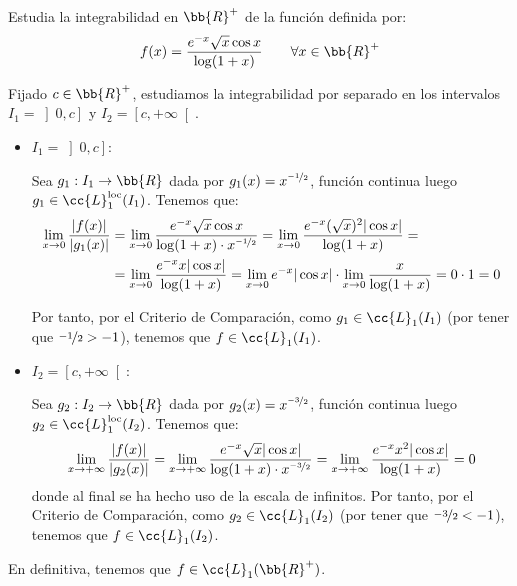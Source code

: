 \begin{ejercicio}
    Estudia la integrabilidad en $\bb{R}^+$ de la función definida por:
    \begin{equation*}
        f(x) = \dfrac{e^{-x}\sqrt{x}\cos x}{\log(1+x)} \qquad \forall x\in \bb{R}^+
    \end{equation*}

    Fijado $c\in \bb{R}^+$, estudiamos la integrabilidad por separado en los intervalos $I_1=\left]0,c\right]$ y $I_2=\left[c,+\infty\right[$.
    \begin{itemize}
        \item \ul{$I_1=\left]0,c\right]$}:
        
        Sea $g_1:I_1\to \bb{R}$ dada por $g_1(x)=x^{\nicefrac{-1}{2}}$, función continua luego $g_1\in \cc{L}_1^{\text{loc}}(I_1)$. Tenemos que:
        \begin{align*}
            \lim_{x\to 0} \dfrac{|f(x)|}{|g_1(x)|}
            &= \lim_{x\to 0} \dfrac{e^{-x}\sqrt{x}\cos x}{\log(1+x)\cdot x^{\nicefrac{-1}{2}}}
            = \lim_{x\to 0} \dfrac{e^{-x}(\sqrt{x})^2|\cos x|}{\log(1+x)}
            =\\&= \lim_{x\to 0} \dfrac{e^{-x}x|\cos x|}{\log(1+x)}
            = \lim_{x\to 0} e^{-x}|\cos x| \cdot \lim_{x\to 0} \dfrac{x}{\log(1+x)}
            = 0\cdot 1 = 0
        \end{align*}

        Por tanto, por el Criterio de Comparación, como $g_1\in \cc{L}_1(I_1)$ (por tener que $\nicefrac{-1}{2}>-1$), tenemos que $f\in \cc{L}_1(I_1)$.

        \item \ul{$I_2=\left[c,+\infty\right[$}:
        
        Sea $g_2:I_2\to \bb{R}$ dada por $g_2(x)=x^{\nicefrac{-3}{2}}$, función continua luego $g_2\in \cc{L}_1^{\text{loc}}(I_2)$. Tenemos que:
        \begin{align*}
            \lim_{x\to +\infty} \dfrac{|f(x)|}{|g_2(x)|}
            = \lim_{x\to +\infty} \dfrac{e^{-x}\sqrt{x}|\cos x|}{\log(1+x)\cdot x^{\nicefrac{-3}{2}}}
            = \lim_{x\to +\infty} \dfrac{e^{-x}x^2|\cos x|}{\log(1+x)} = 0
        \end{align*}
        donde al final se ha hecho uso de la escala de infinitos. Por tanto, por el Criterio de Comparación, como $g_2\in \cc{L}_1(I_2)$ (por tener que $\nicefrac{-3}{2}<-1$), tenemos que $f\in \cc{L}_1(I_2)$.
    \end{itemize}

    En definitiva, tenemos que $f\in \cc{L}_1(\bb{R}^+)$.
\end{ejercicio}